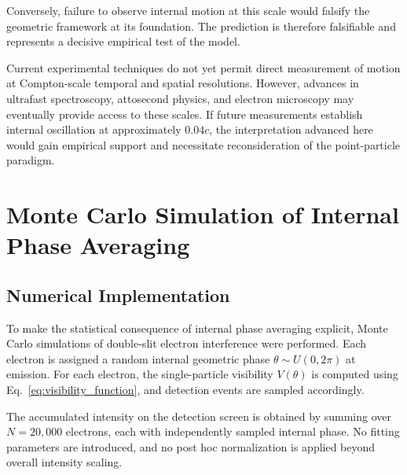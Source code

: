 \documentclass[%
 reprint,
 amsmath,amssymb,
 aps,
 prb,
]{revtex4-2}
\numberwithin{equation}{section}
\begin{document}
Conversely, failure to observe internal motion at this scale would falsify the geometric framework at its foundation. The prediction is therefore falsifiable and represents a decisive empirical test of the model.

Current experimental techniques do not yet permit direct measurement of motion at Compton-scale temporal and spatial resolutions. However, advances in ultrafast spectroscopy, attosecond physics, and electron microscopy may eventually provide access to these scales. If future measurements establish internal oscillation at approximately $0.04c$, the interpretation advanced here would gain empirical support and necessitate reconsideration of the point-particle paradigm.


\section{Monte Carlo Simulation of Internal Phase Averaging}
\label{sec:monte_carlo}

\subsection{Numerical Implementation}
\label{subsec:numerical_implementation}

To make the statistical consequence of internal phase averaging explicit, Monte Carlo simulations of double-slit electron interference were performed. Each electron is assigned a random internal geometric phase $\theta \sim U(0, 2\pi)$ at emission. For each electron, the single-particle visibility $V(\theta)$ is computed using Eq.~\eqref{eq:visibility_function}, and detection events are sampled accordingly.

The accumulated intensity on the detection screen is obtained by summing over $N = 20{,}000$ electrons, each with independently sampled internal phase. No fitting parameters are introduced, and no post hoc normalization is applied beyond overall intensity scaling.
\end{document}
